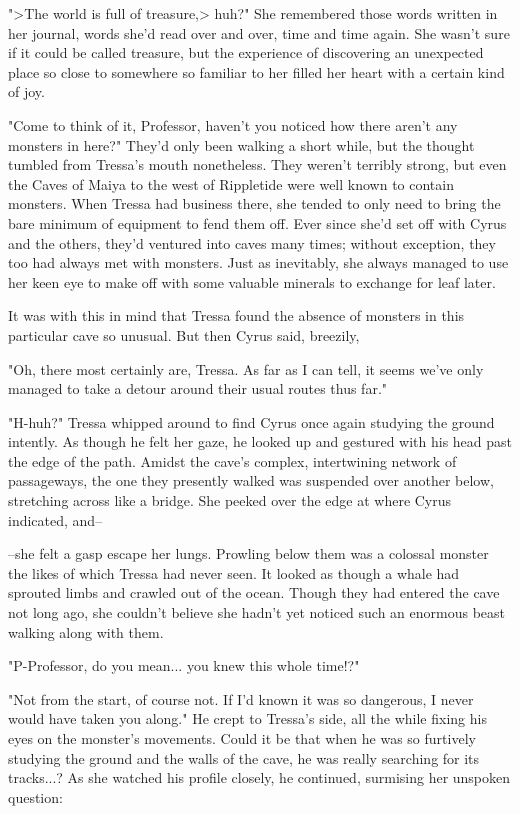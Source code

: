 ">The world is full of treasure,> huh?" She remembered those words written in her journal, words she'd read over and over, time and time again. She wasn't sure if it could be called treasure, but the experience of discovering an unexpected place so close to somewhere so familiar to her filled her heart with a certain kind of joy.

"Come to think of it, Professor, haven't you noticed how there aren't any monsters in here?" They'd only been walking a short while, but the thought tumbled from Tressa's mouth nonetheless. They weren't terribly strong, but even the Caves of Maiya to the west of Rippletide were well known to contain monsters. When Tressa had business there, she tended to only need to bring the bare minimum of equipment to fend them off. Ever since she'd set off with Cyrus and the others, they'd ventured into caves many times; without exception, they too had always met with monsters. Just as inevitably, she always managed to use her keen eye to make off with some valuable minerals to exchange for leaf later.

It was with this in mind that Tressa found the absence of monsters in this particular cave so unusual. But then Cyrus said, breezily,

"Oh, there most certainly are, Tressa. As far as I can tell, it seems we've only managed to take a detour around their usual routes thus far."

"H-huh?" Tressa whipped around to find Cyrus once again studying the ground intently. As though he felt her gaze, he looked up and gestured with his head past the edge of the path. Amidst the cave's complex, intertwining network of passageways, the one they presently walked was suspended over another below, stretching across like a bridge. She peeked over the edge at where Cyrus indicated, and--

--she felt a gasp escape her lungs. Prowling below them was a colossal monster the likes of which Tressa had never seen. It looked as though a whale had sprouted limbs and crawled out of the ocean. Though they had entered the cave not long ago, she couldn't believe she hadn't yet noticed such an enormous beast walking along with them.

"P-Professor, do you mean... you knew this whole time!?"

"Not from the start, of course not. If I'd known it was so dangerous, I never would have taken you along." He crept to Tressa's side, all the while fixing his eyes on the monster's movements. Could it be that when he was so furtively studying the ground and the walls of the cave, he was really searching for its tracks...? As she watched his profile closely, he continued, surmising her unspoken question:

